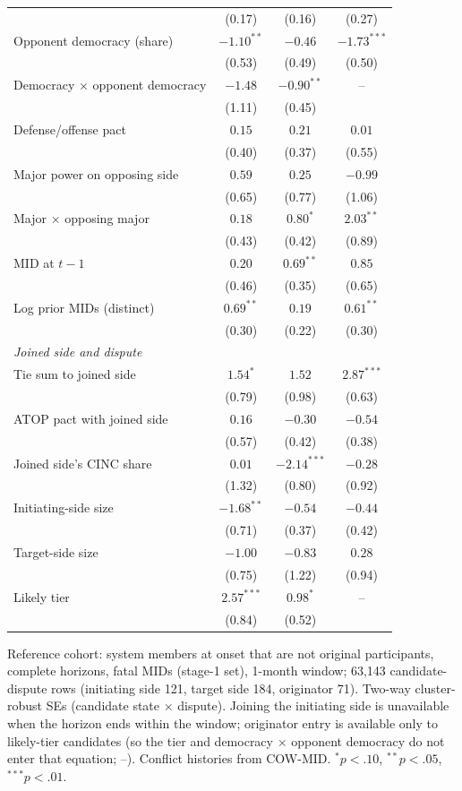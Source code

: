 \documentclass[11pt]{article}
\begin{document}
\begin{table}[!htbp]
\begin{tabular}{lccc}
 & (0.17) & (0.16) & (0.27) \\
Opponent democracy (share) & $-1.10^{**}$ & $-0.46$ & $-1.73^{***}$ \\
 & (0.53) & (0.49) & (0.50) \\
Democracy $\times$ opponent democracy & $-1.48$ & $-0.90^{**}$ & -- \\
 & (1.11) & (0.45) &  \\
Defense/offense pact & $0.15$ & $0.21$ & $0.01$ \\
 & (0.40) & (0.37) & (0.55) \\
Major power on opposing side & $0.59$ & $0.25$ & $-0.99$ \\
 & (0.65) & (0.77) & (1.06) \\
Major $\times$ opposing major & $0.18$ & $0.80^{*}$ & $2.03^{**}$ \\
 & (0.43) & (0.42) & (0.89) \\
MID at $t-1$ & $0.20$ & $0.69^{**}$ & $0.85$ \\
 & (0.46) & (0.35) & (0.65) \\
Log prior MIDs (distinct) & $0.69^{**}$ & $0.19$ & $0.61^{**}$ \\
 & (0.30) & (0.22) & (0.30) \\
\midrule
\multicolumn{4}{l}{\emph{Joined side and dispute}} \\
Tie sum to joined side & $1.54^{*}$ & $1.52$ & $2.87^{***}$ \\
 & (0.79) & (0.98) & (0.63) \\
ATOP pact with joined side & $0.16$ & $-0.30$ & $-0.54$ \\
 & (0.57) & (0.42) & (0.38) \\
Joined side's CINC share & $0.01$ & $-2.14^{***}$ & $-0.28$ \\
 & (1.32) & (0.80) & (0.92) \\
Initiating-side size & $-1.68^{**}$ & $-0.54$ & $-0.44$ \\
 & (0.71) & (0.37) & (0.42) \\
Target-side size & $-1.00$ & $-0.83$ & $0.28$ \\
 & (0.75) & (1.22) & (0.94) \\
Likely tier & $2.57^{***}$ & $0.98^{*}$ & -- \\
 & (0.84) & (0.52) &  \\
\bottomrule
\end{tabular}
\begin{minipage}{0.95\linewidth}\footnotesize\smallskip Reference cohort: system members at onset that are not original participants, complete horizons, fatal MIDs (stage-1 set), 1-month window; 63,143 candidate-dispute rows (initiating side 121, target side 184, originator 71). Two-way cluster-robust SEs (candidate state $\times$ dispute). Joining the initiating side is unavailable when the horizon ends within the window; originator entry is available only to likely-tier candidates (so the tier and democracy $\times$ opponent democracy do not enter that equation; --). Conflict histories from COW-MID. $^{*}p<.10$, $^{**}p<.05$, $^{***}p<.01$.\end{minipage}
\end{table}
\end{document}
